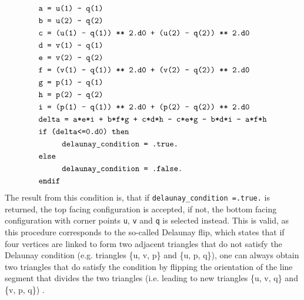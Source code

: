 \documentclass[./main.tex]{subfiles}
\begin{document}
 \begin{align*}
&    \texttt{a = u(1) - q(1)}\\
&    \texttt{b = u(2) - q(2)}\\
&    \texttt{c = (u(1) - q(1)) ** 2.d0 + (u(2) - q(2)) ** 2.d0}\\
&    \texttt{d = v(1) - q(1)}\\
&    \texttt{e = v(2) - q(2)}\\
&    \texttt{f = (v(1) - q(1)) ** 2.d0 + (v(2) - q(2)) ** 2.d0}\\
&    \texttt{g = p(1) - q(1)}\\
&    \texttt{h = p(2) - q(2)}\\
&    \texttt{i = (p(1) - q(1)) ** 2.d0 + (p(2) - q(2)) ** 2.d0}\\
&    \texttt{delta = a*e*i + b*f*g + c*d*h - c*e*g - b*d*i - a*f*h}\\
&    \texttt{if (delta<=0.d0) then}\\
& \hspace{1.cm}  \texttt{delaunay\_condition = .true.}\\
&    \texttt{else}\\
& \hspace{1.cm}  \texttt{delaunay\_condition = .false.}\\
&    \texttt{endif}\\
\end{align*}
The result from this condition is, that if \texttt{delaunay\_condition =.true.} is returned, the top facing configuration is accepted, if not, the bottom facing configuration with corner points \texttt{u}, \texttt{v} and \texttt{q} is selected instead. This is valid, as this procedure corresponds to the so-called Delaunay flip, which states that if four vertices are linked to form two adjacent triangles that do not satisfy the Delaunay condition (e.g. triangles \{u, v, p\} and \{u, p, q\}), one can always obtain two triangles that do satisfy the condition by flipping the orientation of the line segment that divides the two triangles (i.e. leading to new triangles \{u, v, q\} and \{v, p, q\}) \cite{Delaunay_triangulation}.
\end{document}

